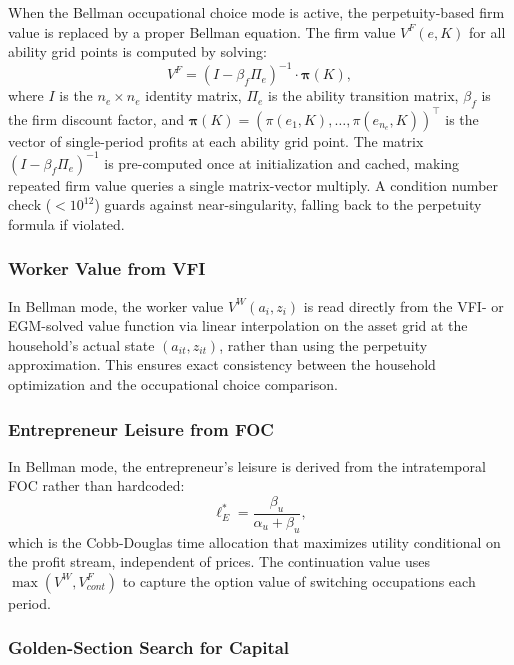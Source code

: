 \documentclass[12pt]{article}
\begin{document}
When the Bellman occupational choice mode is active, the perpetuity-based firm value is replaced by a proper Bellman equation. The firm value $V^F(e, K)$ for all ability grid points is computed by solving:
\begin{equation}\label{eq:firm_bellman}
  V^F = (I - \beta_f \Pi_e)^{-1} \cdot \boldsymbol{\pi}(K),
\end{equation}
where $I$ is the $n_e \times n_e$ identity matrix, $\Pi_e$ is the ability transition matrix, $\beta_f$ is the firm discount factor, and $\boldsymbol{\pi}(K) = (\pi(e_1, K), \ldots, \pi(e_{n_e}, K))^\top$ is the vector of single-period profits at each ability grid point. The matrix $(I - \beta_f \Pi_e)^{-1}$ is pre-computed once at initialization and cached, making repeated firm value queries a single matrix-vector multiply. A condition number check ($< 10^{12}$) guards against near-singularity, falling back to the perpetuity formula if violated.

\subsubsection{Worker Value from VFI}

In Bellman mode, the worker value $V^W(a_i, z_i)$ is read directly from the VFI- or EGM-solved value function via linear interpolation on the asset grid at the household's actual state $(a_{it}, z_{it})$, rather than using the perpetuity approximation. This ensures exact consistency between the household optimization and the occupational choice comparison.

\subsubsection{Entrepreneur Leisure from FOC}

In Bellman mode, the entrepreneur's leisure is derived from the intratemporal FOC rather than hardcoded:
\begin{equation}\label{eq:entre_foc_leisure}
  \ell^*_E = \frac{\beta_u}{\alpha_u + \beta_u},
\end{equation}
which is the Cobb-Douglas time allocation that maximizes utility conditional on the profit stream, independent of prices. The continuation value uses $\max(V^W, V^F_{cont})$ to capture the option value of switching occupations each period.

\subsubsection{Golden-Section Search for Capital}
\end{document}
